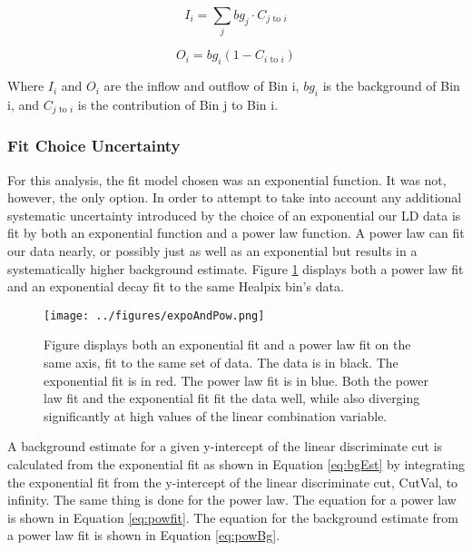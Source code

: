 \begin{equation} \label{eq:inflow}
I_i = \sum_j bg_j \cdot C_{j\textrm{ to }i}
\end{equation}

\begin{equation} \label{eq:outflow}
O_i = bg_i (1-C_{i\textrm{ to }i})
\end{equation}

Where $I_i$ and $O_i$ are the inflow and outflow of Bin i, $bg_i$ is the background of Bin i, and $C_{j\textrm{ to }i}$ is the contribution of Bin j to Bin i.

\subsubsection{Fit Choice Uncertainty}

For this analysis, the fit model chosen was an exponential function.  It was not, however, the only option.  In order to attempt to take into account any additional systematic uncertainty introduced by the choice of an exponential our LD data is fit by both an exponential function and a power law function.  A power law can fit our data nearly, or possibly just as well as an exponential but results in a systematically higher background estimate.  Figure \ref{fig:expoAndPow} displays both a power law fit and an exponential decay fit to the same Healpix bin's data.  

\begin{figure}[h]
\centering
\texttt{[image: ../figures/expoAndPow.png]}
\caption[Example Exponential and Power-law Fit]{Figure displays both an exponential fit and a power law fit on the same axis, fit to the same set of data.  The data is in black.  The exponential fit is in red.  The power law fit is in blue.  Both the power law fit and the exponential fit fit the data well, while also diverging significantly at high values of the linear combination variable. }
\label{fig:expoAndPow}
\end{figure}
 
A background estimate for a given y-intercept of the linear discriminate cut is calculated from the exponential fit as shown in Equation \ref{eq:bgEst} by integrating the exponential fit from the y-intercept of the linear discriminate cut, CutVal, to infinity.  The same thing is done for the power law.  The equation for a power law is shown in Equation \ref{eq:powfit}.  The equation for the background estimate from a power law fit is shown in Equation \ref{eq:powBg}.

